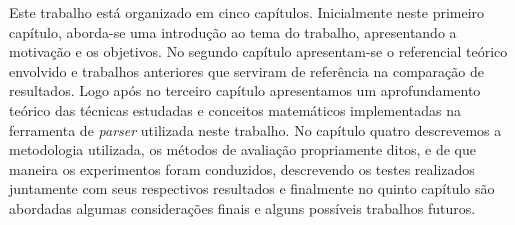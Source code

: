 Este trabalho está organizado em cinco capítulos. Inicialmente neste primeiro capítulo, aborda-se uma introdução ao tema do trabalho, apresentando a motivação e os objetivos. No segundo capítulo apresentam-se o referencial teórico envolvido e trabalhos anteriores que serviram de referência na comparação de resultados. Logo após no terceiro capítulo apresentamos um aprofundamento teórico das técnicas estudadas e conceitos matemáticos implementadas na ferramenta de \emph{parser} utilizada neste trabalho. No capítulo quatro descrevemos a metodologia utilizada, os métodos de avaliação propriamente ditos, e de que maneira os experimentos foram conduzidos, descrevendo os testes realizados juntamente com seus respectivos resultados e finalmente no quinto capítulo são abordadas algumas considerações finais e alguns possíveis trabalhos futuros.
